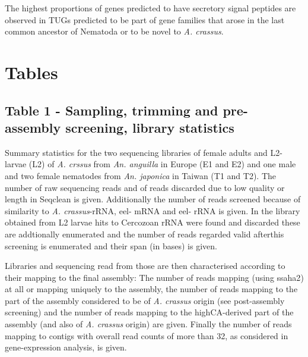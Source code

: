 \documentclass[10pt]{bmc_article}
\newenvironment{bmcformat}{\begin{raggedright}\baselineskip20pt\sloppy\setboolean{publ}{false}}{\end{raggedright}\baselineskip20pt\sloppy}
\begin{document}
\begin{bmcformat}
The highest proportions of genes predicted to have secretory signal
peptides are observed in TUGs predicted to be part of gene families
that arose in the last common ancestor of Nematoda or to be novel to
\textit{A. crassus}.


\newpage

\section*{Tables}
\subsection*{Table 1 - Sampling, trimming and pre-assembly screening,
  library statistics}

Summary statistics for the two sequencing libraries of female adults
and L2-larvae (L2) of \textit{A. crssus} from \textit{An. anguilla} in
Europe (E1 and E2) and one male and two female nematodes from
\textit{An. japonica} in Taiwan (T1 and T2). The number of raw
sequencing reads and of reads discarded due to low quality or length
in Seqclean \cite{tgicl_pertea} is given. Additionally the number of
reads screened because of similarity to \textit{A. crassus}-rRNA, eel-
mRNA and eel- rRNA is given. In the library obtained from L2 larvae
hits to Cercozoan rRNA were found and discarded these are addtionally
enumerated and the number of reads regarded valid afterthis screening
is enumerated and their span (in bases) is given.

Libraries and sequencing read from those are then characterised
according to their mapping to the final assembly: The number of reads
mapping (using ssaha2\cite{pmid11591649}) at all or mapping uniquely
to the assembly, the number of reads mapping to the part of the
assembly considered to be of \textit{A. crassus} origin (see
post-assembly screening) and the number of reads mapping to the
highCA-derived part of the assembly (and also of \textit{A. crassus}
origin) are given. Finally the number of reads mapping to contigs with
overall read counts of more than 32, as considered in gene-expression
analysis, is given.


\end{bmcformat}
\end{document}
